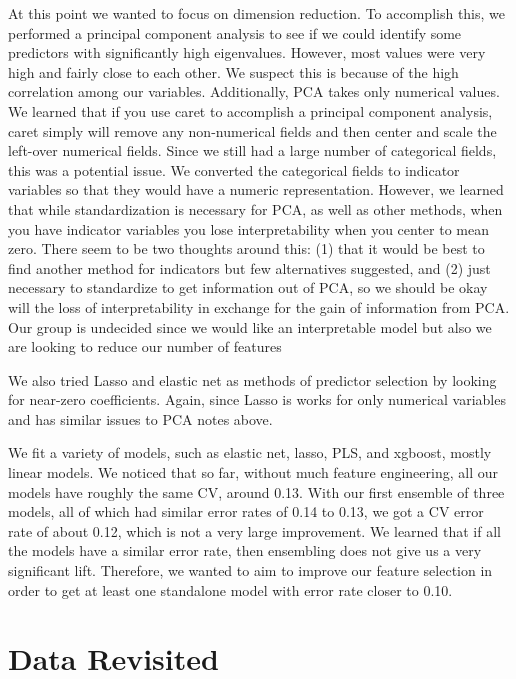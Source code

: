 \documentclass[12pt]{article}
\begin{document}
At this point we wanted to focus on dimension reduction.   To accomplish this, we performed a principal component analysis to see if we could identify some predictors with significantly high eigenvalues. However, most values were very high and fairly close to each other.  We suspect this is because of the high correlation among our variables.  Additionally, PCA takes only numerical values.  We learned that if you use caret to accomplish a principal component analysis, caret simply will remove any non-numerical fields and then center and scale the left-over numerical fields.  Since we still had a large number of categorical fields, this was a potential issue.  We converted the categorical fields to indicator variables so that they would have a numeric representation.  However, we learned that while standardization is necessary for PCA, as well as other methods, when you have indicator variables you lose interpretability when you center to mean zero.  There seem to be two thoughts around this: (1) that it would be best to find another method for indicators but few alternatives suggested, and (2) just necessary to standardize to get information out of PCA, so we should be okay will the loss of interpretability in exchange for the gain of information from PCA.  Our group is undecided since we would like an interpretable model but also we are looking to reduce our number of features

We also tried Lasso and elastic net as methods of predictor selection by looking for near-zero coefficients.  Again, since Lasso is works for only numerical variables and has similar issues to PCA notes above.

We fit a variety of models, such as elastic net, lasso, PLS, and xgboost, mostly linear models.  We noticed that so far, without much feature engineering, all our models have roughly the same CV, around 0.13.   With our first ensemble of three models, all of which had similar error rates of 0.14 to 0.13, we got a CV error rate of about 0.12, which is not a very large improvement.  We learned that if all the models have a similar error rate, then ensembling does not give us a very significant lift.  Therefore, we wanted to aim to improve our feature selection in order to get at least one standalone model with error rate closer to 0.10.

\section{Data Revisited}
\end{document}
